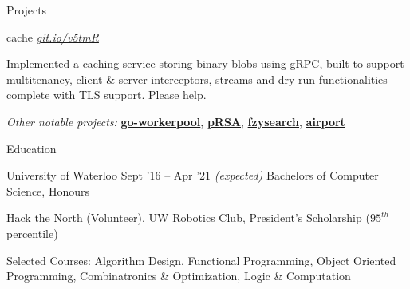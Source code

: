 \documentclass{resume} %
\begin{document}
\begin{rSection}{Projects}
  \begin{rSubsection}{cache}
	  {\em {\href{http://github.com/ridwanmsharif/cache}
		    {git.io/v5tmR}}}
	  {}

    \item Implemented a caching service storing binary blobs using gRPC, built to support multitenancy, 
      client \& server interceptors, streams and dry run functionalities complete with TLS support. Please help.
  \end{rSubsection}
  
  \begin{rMinisection}
    \item {\em Other notable projects:}
      \href{https://github.com/ridwanmsharif/goworkerpool}{\textbf{go-workerpool}},
      \href{https://github.com/ridwanmsharif/prsa}{\textbf{pRSA}},
      \href{https://github.com/ridwanmsharif/fzysearch}{\textbf{fzysearch}},
      \href{https://github.com/ridwanmsharif/airport}{\textbf{airport}}
  \end{rMinisection}
\end{rSection}


\begin{rSection}{Education}
  \begin{rSubsection}{University of Waterloo}
		     {Sept '16 -- Apr '21 \em (expected)}
		     {Bachelors of Computer Science, Honours}
		     {}
    \item Hack the North (Volunteer), UW Robotics Club, President's Scholarship
      ($95^{th}$ percentile)
    \item Selected Courses: Algorithm Design, Functional Programming, Object
      Oriented Programming, Combinatronics \& Optimization, Logic \&
      Computation
  \end{rSubsection}
\end{rSection} 
\end{document}
